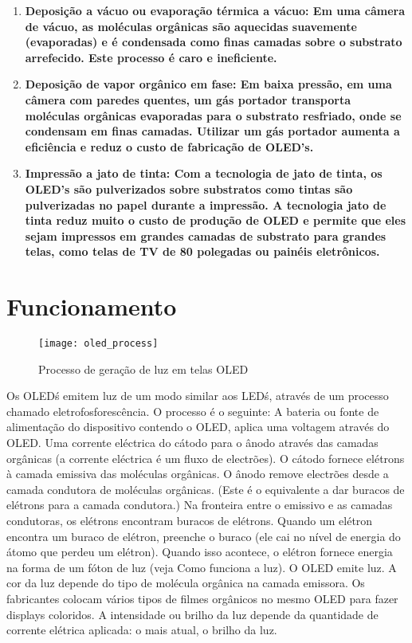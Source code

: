 \begin{enumerate}
	\item \bf{Deposição a vácuo ou evaporação térmica a vácuo:} Em uma câmera de vácuo, as moléculas orgânicas são aquecidas suavemente (evaporadas) e é condensada como finas camadas sobre o substrato arrefecido. Este processo é caro e ineficiente.

	\item \bf{Deposição de vapor orgânico em fase:} Em baixa pressão, em uma câmera com paredes quentes, um gás portador transporta moléculas orgânicas evaporadas para o substrato resfriado, onde se condensam em finas camadas. Utilizar um gás portador aumenta a eficiência e reduz o custo de fabricação de OLED's.

	\item \bf{Impressão a jato de tinta:} Com a tecnologia de jato de tinta, os OLED's são pulverizados sobre substratos como tintas são pulverizadas no papel durante a impressão. A tecnologia jato de tinta reduz muito o custo de produção de OLED e permite que eles sejam impressos em grandes camadas de substrato para grandes telas, como telas de TV de 80 polegadas ou painéis eletrônicos.
\end{enumerate}


\section{Funcionamento}
\label{sec:funcionamento}

\begin{figure}[!h]
  \centering
  \texttt{[image: oled\_process]} 
  \caption{Processo de geração de luz em telas OLED}
  \label{fig:oled_process} 
\end{figure}

Os OLED\'s emitem luz de um modo similar aos LED\'s, através de um processo chamado eletrofosforescência. 
O processo é o seguinte: 
A bateria ou fonte de alimentação do dispositivo contendo o OLED, aplica uma voltagem através do OLED. 
Uma corrente eléctrica do cátodo para o ânodo através das camadas orgânicas (a corrente eléctrica é um fluxo de electrões). O cátodo fornece elétrons à camada emissiva das moléculas orgânicas. O ânodo remove electrões desde a camada condutora de moléculas orgânicas. (Este é o equivalente a dar buracos de elétrons para a camada condutora.) 
Na fronteira entre o emissivo e as camadas condutoras, os elétrons encontram buracos de elétrons. Quando um elétron encontra um buraco de elétron, preenche o buraco (ele cai no nível de energia do átomo que perdeu um elétron). Quando isso acontece, o elétron fornece energia na forma de um fóton de luz (veja Como funciona a luz). 
O OLED emite luz. 
A cor da luz depende do tipo de molécula orgânica na camada emissora. Os fabricantes colocam vários tipos de filmes orgânicos no mesmo OLED para fazer displays coloridos. 
A intensidade ou brilho da luz depende da quantidade de corrente elétrica aplicada: o mais atual, o brilho da luz.


